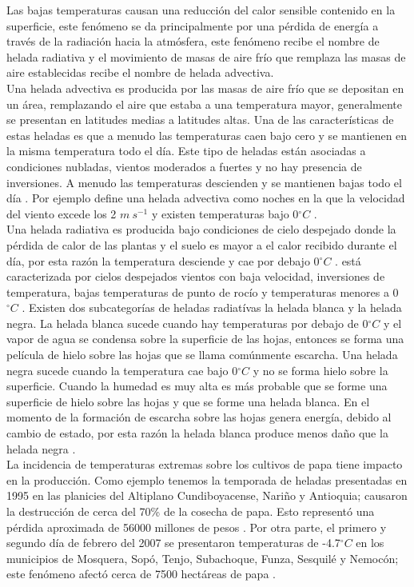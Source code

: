 \documentclass[11pt]{article}
\def\celc{$^{\circ}C$ }%
\begin{document}
Las bajas temperaturas causan una reducción del calor sensible contenido en la superficie, este fenómeno se da principalmente por una pérdida de energía a través de la radiación hacia la atmósfera, este fenómeno recibe el nombre de helada radiativa y el movimiento de masas de aire frío que remplaza las masas de aire establecidas recibe el nombre de helada advectiva.\\

Una helada advectiva es producida por las masas de aire frío que se depositan en un área, remplazando el aire que estaba a una temperatura mayor, generalmente se presentan en latitudes medias a latitudes altas. Una de las características de estas heladas es que a menudo las temperaturas caen bajo cero y se mantienen en la misma temperatura todo el día. Este tipo de  heladas están asociadas a condiciones nubladas, vientos moderados a fuertes y no hay presencia de inversiones. A menudo las temperaturas descienden y se mantienen bajas todo el día \citep{Prabha2008a, IDEAM2012a}. Por ejemplo \citet{Prabha2008a} define una helada advectiva como noches en la que la velocidad del viento excede los 2 $m\ s^{-1}$ y existen temperaturas bajo 0\celc.\\

Una helada radiativa es producida bajo condiciones de cielo despejado donde la pérdida de calor de las plantas y el suelo es mayor a el calor recibido durante el día, por esta razón la temperatura desciende y cae por debajo 0\celc. está caracterizada por cielos despejados vientos con baja velocidad, inversiones de temperatura, bajas temperaturas de punto de rocío y temperaturas menores a 0\celc \citep{Halley2003, IDEAM2012a}. Existen dos subcategorías de heladas radiatívas la helada blanca y la helada negra. La helada blanca sucede cuando hay temperaturas por debajo de 0\celc y el vapor de agua se condensa sobre la superficie de las hojas, entonces se forma una película de hielo sobre las hojas que se llama comúnmente escarcha. Una helada negra sucede cuando la temperatura cae bajo 0\celc y no se forma hielo sobre la superficie. Cuando la humedad es muy alta es más probable que se forme una superficie de hielo sobre las hojas y que se forme una helada blanca. En el momento de la formación de escarcha sobre las hojas genera energía, debido al cambio de estado, por esta razón la helada blanca produce menos daño que la helada negra \citep{Snyder2010}.\\

La incidencia de temperaturas extremas sobre los cultivos de papa tiene impacto en la producción. Como ejemplo tenemos la temporada de heladas presentadas en 1995 en las planicies del Altiplano Cundiboyacense,  Nariño y Antioquia; causaron la destrucción de cerca del 70\% de la cosecha de papa. Esto representó una pérdida aproximada de 56000 millones de pesos \citep{Romero1996}. Por otra parte, el primero y segundo día de febrero del 2007 se presentaron temperaturas de -4.7\celc en los municipios de Mosquera, Sopó, Tenjo, Subachoque, Funza, Sesquilé y Nemocón; este fenómeno afectó cerca de 7500 hectáreas de papa \citep{ElTiempo2007}.\\
\end{document}
